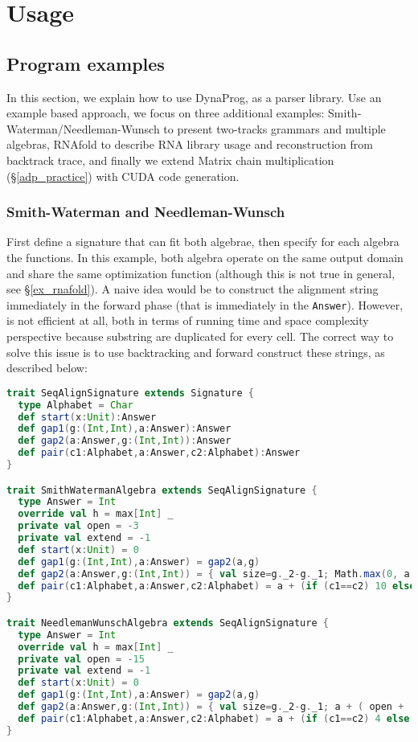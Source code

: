 \newpage
\section{Usage} \label{usage}
\subsection{Program examples}
In this section, we explain how to use DynaProg, as a parser library. Use an example based approach, we focus on three additional examples: Smith-Waterman/Needleman-Wunsch to present two-tracks grammars and multiple algebras, RNAfold\cite{gpu_rnafold} to describe RNA library usage and reconstruction from backtrack trace, and finally we extend Matrix chain multiplication (\S\ref{adp_practice}) with CUDA code generation.

\subsubsection{Smith-Waterman and Needleman-Wunsch} \label{ex_swat}
First define a signature that can fit both algebrae, then specify for each algebra the functions. In this example, both algebra operate on the same output domain and share the same optimization function (although this is not true in general, see \S\ref{ex_rnafold}). A naive idea would be to construct the alignment string immediately in the forward phase (that is immediately in the {\tt Answer}). However, is not efficient at all, both in terms of running time and space complexity perspective because substring are duplicated for every cell. The correct way to solve this issue is to use backtracking and forward construct these strings, as described below:
\begin{lstlisting}[language=Scala,captionpos=none]
trait SeqAlignSignature extends Signature {
  type Alphabet = Char
  def start(x:Unit):Answer
  def gap1(g:(Int,Int),a:Answer):Answer
  def gap2(a:Answer,g:(Int,Int)):Answer
  def pair(c1:Alphabet,a:Answer,c2:Alphabet):Answer
}

trait SmithWatermanAlgebra extends SeqAlignSignature {
  type Answer = Int
  override val h = max[Int] _
  private val open = -3
  private val extend = -1
  def start(x:Unit) = 0
  def gap1(g:(Int,Int),a:Answer) = gap2(a,g)
  def gap2(a:Answer,g:(Int,Int)) = { val size=g._2-g._1; Math.max(0, a + ( open + (size-1) * extend )) }
  def pair(c1:Alphabet,a:Answer,c2:Alphabet) = a + (if (c1==c2) 10 else -3)
}

trait NeedlemanWunschAlgebra extends SeqAlignSignature {
  type Answer = Int
  override val h = max[Int] _
  private val open = -15
  private val extend = -1
  def start(x:Unit) = 0
  def gap1(g:(Int,Int),a:Answer) = gap2(a,g)
  def gap2(a:Answer,g:(Int,Int)) = { val size=g._2-g._1; a + ( open + (size-1) * extend ) }
  def pair(c1:Alphabet,a:Answer,c2:Alphabet) = a + (if (c1==c2) 4 else -3)
}
\end{lstlisting}

